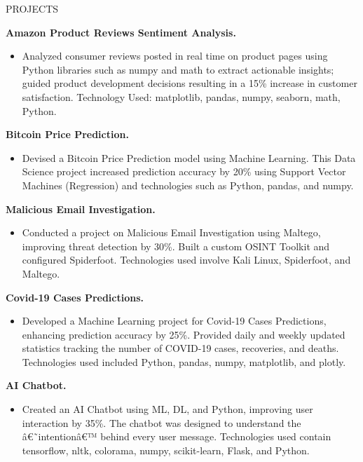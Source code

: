 \documentclass{resume} %
\begin{document}
\begin{rSection}{PROJECTS}
\vspace{-1.25em}
\item \textbf{ Amazon Product Reviews Sentiment Analysis.} 
    \begin{itemize}
    \item  Analyzed consumer reviews posted in real time on product pages using Python libraries such as numpy and math to extract actionable insights; guided product development decisions resulting in a 15\% increase in customer satisfaction. Technology Used: matplotlib, pandas, numpy, seaborn, math, Python. \href{https://hig-search.careerflow.ai/}{}
     \end{itemize}
\item \textbf{ Bitcoin Price Prediction.}
    \begin{itemize}
    \item { Devised a Bitcoin Price Prediction model using Machine Learning. This Data Science project increased prediction accuracy by 20\% using Support Vector Machines (Regression) and technologies such as Python, pandas, and numpy.}
    \end{itemize}
\item \textbf{ Malicious Email Investigation.}
    \begin{itemize}
    \item { Conducted a project on Malicious Email Investigation using Maltego, improving threat detection by 30\%. Built a custom OSINT Toolkit and configured Spiderfoot. Technologies used involve Kali Linux, Spiderfoot, and Maltego.}
    \end{itemize}
\item \textbf{ Covid-19 Cases Predictions.}
    \begin{itemize}
    \item { Developed a Machine Learning project for Covid-19 Cases Predictions, enhancing prediction accuracy by 25\%. Provided daily and weekly updated statistics tracking the number of COVID-19 cases, recoveries, and deaths. Technologies used included Python, pandas, numpy, matplotlib, and plotly.}
    \end{itemize}
\item \textbf{ AI Chatbot.}
    \begin{itemize}
    \item { Created an AI Chatbot using ML, DL, and Python, improving user interaction by 35\%. The chatbot was designed to understand the â€˜intentionâ€™ behind every user message. Technologies used contain tensorflow, nltk, colorama, numpy, scikit-learn, Flask, and Python.}
    \end{itemize}
\end{rSection} 
\end{document}
